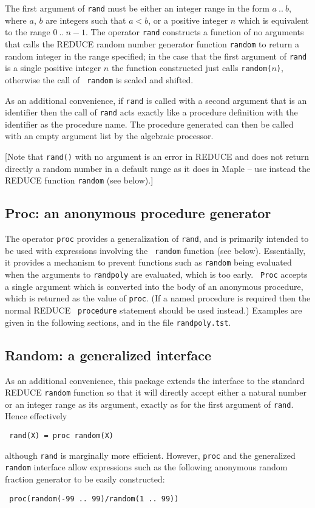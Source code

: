 The first argument of {\tt rand} must be either an integer range in
the form $a~..~b$, where $a$, $b$ are integers such that $a < b$, or a
positive integer $n$ which is equivalent to the range $0~..~n-1$.  The
operator {\tt rand} constructs a function of no arguments that calls
the REDUCE random number generator function {\tt random} to return a
random integer in the range specified; in the case that the first
argument of {\tt rand} is a single positive integer $n$ the function
constructed just calls {\tt random($n$)}, otherwise the call of {\tt
random} is scaled and shifted.

As an additional convenience, if {\tt rand} is called with a second
argument that is an identifier then the call of {\tt rand} acts
exactly like a procedure definition with the identifier as the
procedure name.  The procedure generated can then be called with an
empty argument list by the algebraic processor.

[Note that {\tt rand()} with no argument is an error in REDUCE and
does not return directly a random number in a default range as it does
in Maple -- use instead the REDUCE function {\tt random} (see below).]


\subsection{Proc: an anonymous procedure generator}

The operator {\tt proc} provides a generalization of {\tt rand}, and
is primarily intended to be used with expressions involving the {\tt
random} function (see below).  Essentially, it provides a mechanism to
prevent functions such as {\tt random} being evaluated when the
arguments to {\tt randpoly} are evaluated, which is too early.  {\tt
Proc} accepts a single argument which is converted into the body of an
anonymous procedure, which is returned as the value of {\tt proc}.
(If a named procedure is required then the normal REDUCE {\tt
procedure} statement should be used instead.)  Examples are given in
the following sections, and in the file {\tt randpoly.tst}.


\subsection{Random: a generalized interface}

As an additional convenience, this package extends the interface to
the standard REDUCE {\tt random} function so that it will directly
accept either a natural number or an integer range as its argument,
exactly as for the first argument of {\tt rand}.  Hence effectively
\begin{center}\tt
  rand(X) = proc random(X)
\end{center}
although {\tt rand} is marginally more efficient.  However, {\tt proc}
and the generalized {\tt random} interface allow expressions such as
the following anonymous random fraction generator to be easily
constructed:
\begin{center}\tt
  proc(random(-99~..~99)/random(1~..~99))
\end{center}


